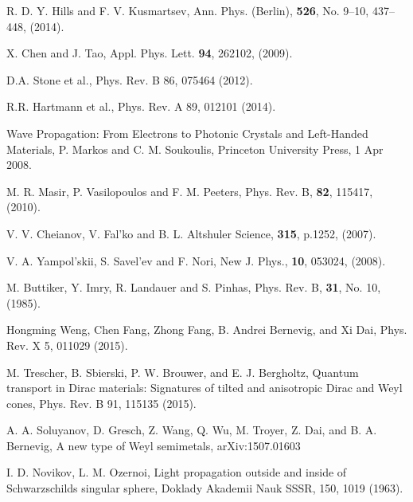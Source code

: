 \documentclass[prb,twocolumn,aps,superscriptaddress,showpacs,floatfix]{revtex4}
\begin{document}
\begin{thebibliography}{10}
R. D. Y. Hills and F. V. Kusmartsev,
Ann. Phys. (Berlin), {\bf 526}, No. 9–10, 437–448, (2014).

X. Chen and J. Tao,
Appl. Phys. Lett. {\bf 94}, 262102, (2009).

D.A. Stone et al., Phys. Rev. B 86, 075464 (2012). 

R.R. Hartmann et al., Phys. Rev. A 89, 012101 (2014). 

Wave Propagation: From Electrons to Photonic Crystals and Left-Handed Materials,
P. Markos and C. M. Soukoulis,
Princeton University Press, 1 Apr 2008.

M. R. Masir, P. Vasilopoulos and F. M. Peeters,
Phys. Rev. B, {\bf 82}, 115417, (2010).

V. V. Cheianov, V. Fal'ko and B. L. Altshuler
Science, {\bf 315}, p.1252, (2007).

V. A. Yampol'skii, S. Savel'ev and F. Nori,
New J. Phys., {\bf 10}, 053024, (2008).

M. Buttiker, Y. Imry, R. Landauer and S. Pinhas,
Phys. Rev. B, {\bf 31}, No. 10, (1985).


 Hongming Weng, Chen Fang, Zhong Fang, B. Andrei Bernevig, and Xi Dai, Phys. Rev. X 5, 011029 (2015).


  M. Trescher, B. Sbierski, P. W. Brouwer, and E. J. Bergholtz, Quantum transport in Dirac materials: Signatures of tilted and anisotropic Dirac and Weyl cones, Phys. Rev. B 91, 115135 (2015).

 A. A. Soluyanov, D. Gresch, Z. Wang, Q. Wu, M. Troyer, Z. Dai, and B. A.
Bernevig, A new type of Weyl semimetals, arXiv:1507.01603

  I. D. Novikov, L. M. Ozernoi, Light propagation outside and inside of Schwarzschilds singular sphere, Doklady Akademii Nauk SSSR, 150, 1019 (1963).


\end{thebibliography}
\end{document}
